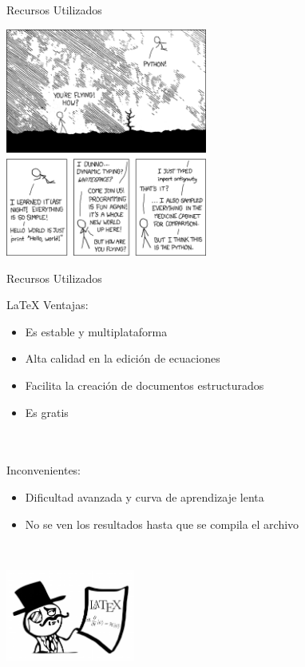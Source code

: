 \documentclass [8pt] {beamer}
\begin{document}
        \begin{frame}{Recursos Utilizados}
            \begin{center}
                \includegraphics[height=7.5cm]{pythonjoke.png}
            \end{center}
        \end{frame}
        \begin{frame}{Recursos Utilizados}
            \begin{block}{\LaTeX{}}
                Ventajas: \\
                    \begin{itemize}
                        \item {Es estable y multiplataforma} 
                        \item {Alta calidad en la edición de ecuaciones}
                        \item {Facilita la creación de documentos estructurados} 
                        \item {Es gratis}
                    \end{itemize}\\ \ \\ 
                Inconvenientes: \\
                    \begin{itemize}
                        \item {Dificultad avanzada y curva de aprendizaje lenta} 
                        \item {No se ven los resultados hasta que se compila el archivo} 
                    \end{itemize}\\ 
                \begin{center}
                    \includegraphics[height=3cm]{latex.png}
                \end{center}
            \end{block}
        \end{frame}
\end{document}
